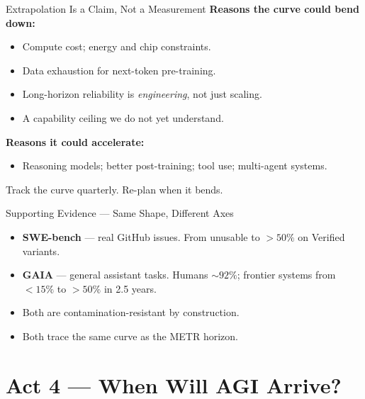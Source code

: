 \documentclass[aspectratio=169, 12pt, xcolor={dvipsnames,table}]{beamer}
\begin{document}
\begin{frame}{Extrapolation Is a Claim, Not a Measurement}
\textbf{Reasons the curve could bend down:}
\begin{itemize}
  \item Compute cost; energy and chip constraints.
  \item Data exhaustion for next-token pre-training.
  \item Long-horizon reliability is \emph{engineering}, not just scaling.
  \item A capability ceiling we do not yet understand.
\end{itemize}
\vspace{0.3em}
\textbf{Reasons it could accelerate:}
\begin{itemize}
  \item Reasoning models; better post-training; tool use; multi-agent systems.
\end{itemize}
\vspace{0.3em}
\alert{Track the curve quarterly. Re-plan when it bends.}
\end{frame}

\begin{frame}{Supporting Evidence --- Same Shape, Different Axes}
\begin{itemize}
  \item \textbf{SWE-bench} \citep{jimenez2024swebench} --- real GitHub issues.
        From unusable to $>50\%$ on Verified variants.
  \item \textbf{GAIA} \citep{mialon2024gaia} --- general assistant tasks.
        Humans $\sim\!92\%$; frontier systems from $<15\%$ to $>50\%$ in 2.5 years.
  \item Both are contamination-resistant by construction.
  \item Both trace the same curve as the METR horizon.
\end{itemize}
\end{frame}

\section{Act 4 --- When Will AGI Arrive?}
\end{document}
